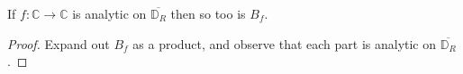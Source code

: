 \begin{lemma}[BlaschkeAnalytic]
\label{BlaschkeAnalytic}
\leanok
If $f:\mathbb{C}\to\mathbb{C}$ is analytic on $\overline{\mathbb{D}_R}$ then so too is $B_f$.
\end{lemma}
\begin{proof}
\leanok
Expand out $B_f$ as a product, and observe that each part is analytic on
    $\overline{\mathbb{D}_R}$.
\end{proof}
